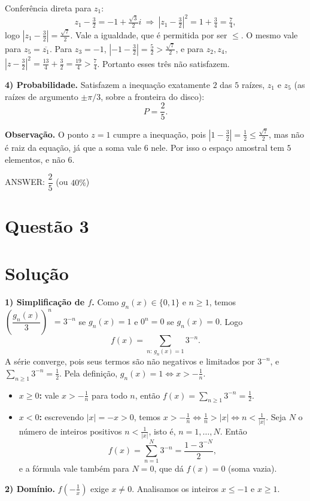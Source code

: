 \documentclass{article}%
\begin{document}
Conferência direta para $z_1$:
$$z_1-\tfrac32=-1+\tfrac{\sqrt3}{2}i\ \Rightarrow\ \left|z_1-\tfrac32\right|^2=1+\tfrac34=\tfrac74,$$
logo $\left|z_1-\tfrac32\right|=\tfrac{\sqrt7}{2}$. Vale a igualdade, que é permitida por ser $\le$. O mesmo vale para $z_5=\overline{z_1}$. Para $z_3=-1$, $\left|-1-\tfrac32\right|=\tfrac52>\tfrac{\sqrt7}{2}$, e para $z_2,z_4$, $\left|z-\tfrac32\right|^2=\tfrac{13}{4}+\tfrac32=\tfrac{19}{4}>\tfrac74$. Portanto esses três não satisfazem.

\textbf{4) Probabilidade.} Satisfazem a inequação exatamente $2$ das $5$ raízes, $z_1$ e $z_5$ (as raízes de argumento $\pm\pi/3$, sobre a fronteira do disco):
$$P=\frac{2}{5}.$$

\textbf{Observação.} O ponto $z=1$ cumpre a inequação, pois $\left|1-\tfrac32\right|=\tfrac12\le\tfrac{\sqrt7}{2}$, mas não é raiz da equação, já que a soma vale $6$ nele. Por isso o espaço amostral tem $5$ elementos, e não $6$.

ANSWER: $\dfrac{2}{5}$ (ou $40\%$)%
\newpage%
\section*{Questão 3}

\section*{Solução}

\textbf{1) Simplificação de $f$.} Como $g_n(x)\in\{0,1\}$ e $n\ge 1$, temos $\left(\dfrac{g_n(x)}{3}\right)^n=3^{-n}$ se $g_n(x)=1$ e $0^n=0$ se $g_n(x)=0$. Logo
\[
f(x)=\sum_{n:\,g_n(x)=1}3^{-n}.
\]
A série converge, pois seus termos são não negativos e limitados por $3^{-n}$, e $\sum_{n\ge1}3^{-n}=\tfrac12$. Pela definição, $g_n(x)=1\iff x>-\tfrac1n$.

\begin{itemize}
\item \textbf{$x\ge 0$:} vale $x>-\tfrac1n$ para todo $n$, então $f(x)=\sum_{n\ge1}3^{-n}=\tfrac12$.
\item \textbf{$x<0$:} escrevendo $|x|=-x>0$, temos $x>-\tfrac1n\iff \tfrac1n>|x|\iff n<\tfrac1{|x|}$. Seja $N$ o número de inteiros positivos $n<\tfrac1{|x|}$, isto é, $n=1,\dots,N$. Então
\[
f(x)=\sum_{n=1}^{N}3^{-n}=\frac{1-3^{-N}}{2},
\]
e a fórmula vale também para $N=0$, que dá $f(x)=0$ (soma vazia).
\end{itemize}

\textbf{2) Domínio.} $f\!\left(-\tfrac1x\right)$ exige $x\neq0$. Analisamos os inteiros $x\le-1$ e $x\ge1$.
\end{document}
